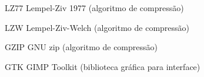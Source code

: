 \documentclass[
	12pt,				%
	openright,			%
	oneside,			%
	a4paper,			%
	english,			%
	french,				%
	spanish,			%
	brazil,				%
	]{lib/abntex2}
\begin{document}

\listoftables*
\cleardoublepage

\begin{siglas}
	\item[LZ77] Lempel-Ziv 1977 (algoritmo de compressão)
	\item[LZW] Lempel-Ziv-Welch (algoritmo de compressão)
    \item[GZIP] GNU zip (algoritmo de compressão)
    \item[GTK] GIMP Toolkit (biblioteca gráfica para interface)
	
\end{siglas}


\tableofcontents*
\cleardoublepage



\pagestyle{simple}









\postextual






\end{document}
